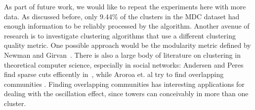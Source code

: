 \documentclass[letterpaper, 11pt, conference]{ieeeconf}
\begin{document}
As part of future work, we would like to repeat the experiments here with more data. As discussed before, only 9.44\% of the clusters in the MDC dataset had enough information to be reliably processed by the algorithm. Another avenue of research is to investigate clustering algorithms that use a different clustering quality metric. One possible approach would be the modularity metric defined by Newman and Girvan~\cite{newman}. There is also a large body of literature on clustering in theoretical computer science, especially in social networks: Andersen and Peres find sparse cuts efficently in~\cite{sparsecuts}, while Aroroa et. al try to find overlapping communities \cite{overlapping}. Finding overlapping communities has interesting applications for dealing with the oscillation effect, since towers can conceivably in more than one cluster.



\end{document}
